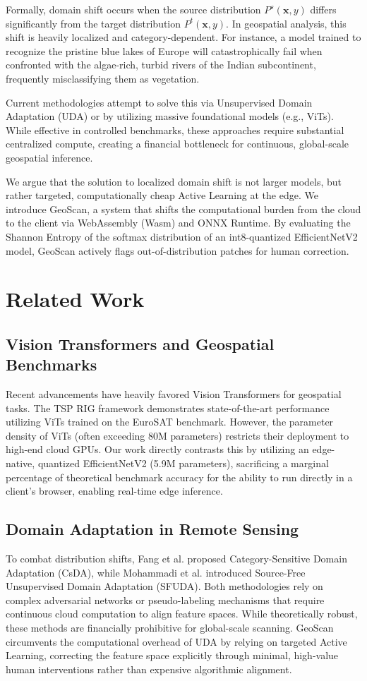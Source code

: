 \documentclass[journal]{IEEEtran}
\begin{document}
Formally, domain shift occurs when the source distribution $P^s(\mathbf{x}, y)$ differs significantly from the target distribution $P^t(\mathbf{x}, y)$. In geospatial analysis, this shift is heavily localized and category-dependent. For instance, a model trained to recognize the pristine blue lakes of Europe will catastrophically fail when confronted with the algae-rich, turbid rivers of the Indian subcontinent, frequently misclassifying them as vegetation.

Current methodologies attempt to solve this via Unsupervised Domain Adaptation (UDA) or by utilizing massive foundational models (e.g., ViTs). While effective in controlled benchmarks, these approaches require substantial centralized compute, creating a financial bottleneck for continuous, global-scale geospatial inference. 

We argue that the solution to localized domain shift is not larger models, but rather targeted, computationally cheap Active Learning at the edge. We introduce GeoScan, a system that shifts the computational burden from the cloud to the client via WebAssembly (Wasm) and ONNX Runtime. By evaluating the Shannon Entropy of the softmax distribution of an int8-quantized EfficientNetV2 model, GeoScan actively flags out-of-distribution patches for human correction.

\section{Related Work}

\subsection{Vision Transformers and Geospatial Benchmarks}
Recent advancements have heavily favored Vision Transformers for geospatial tasks. The TSP RIG framework demonstrates state-of-the-art performance utilizing ViTs trained on the EuroSAT benchmark. However, the parameter density of ViTs (often exceeding 80M parameters) restricts their deployment to high-end cloud GPUs. Our work directly contrasts this by utilizing an edge-native, quantized EfficientNetV2 (5.9M parameters), sacrificing a marginal percentage of theoretical benchmark accuracy for the ability to run directly in a client's browser, enabling real-time edge inference.

\subsection{Domain Adaptation in Remote Sensing}
To combat distribution shifts, Fang et al. proposed Category-Sensitive Domain Adaptation (CsDA), while Mohammadi et al. introduced Source-Free Unsupervised Domain Adaptation (SFUDA). Both methodologies rely on complex adversarial networks or pseudo-labeling mechanisms that require continuous cloud computation to align feature spaces. While theoretically robust, these methods are financially prohibitive for global-scale scanning. GeoScan circumvents the computational overhead of UDA by relying on targeted Active Learning, correcting the feature space explicitly through minimal, high-value human interventions rather than expensive algorithmic alignment.
\end{document}
